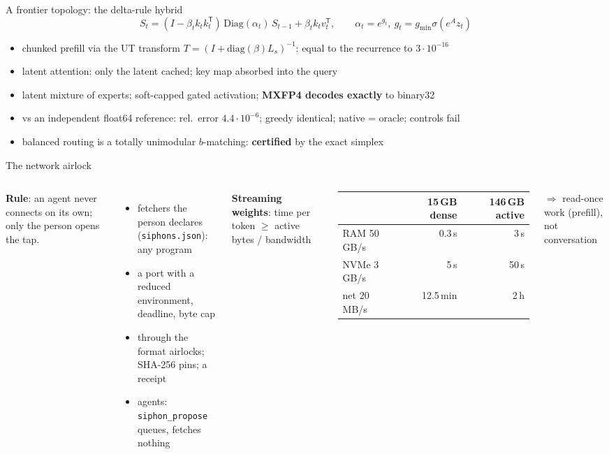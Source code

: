 \documentclass[aspectratio=169,11pt]{beamer}
\begin{document}
\begin{frame}{A frontier topology: the delta-rule hybrid}
\small
\[
S_t = (I - \beta_t k_t k_t^{\mathsf T})\,\mathrm{Diag}(\alpha_t)\,S_{t-1} + \beta_t k_t v_t^{\mathsf T},
\qquad \alpha_t = e^{g_t},\ g_t = g_{\min}\sigma(e^{A}z_t)
\]
\vspace{-0.4em}
\begin{itemize}
\item chunked prefill via the UT transform $T = (I + \mathrm{diag}(\beta)L_s)^{-1}$: equal to the recurrence to $3\cdot10^{-16}$
\item latent attention: only the latent cached; key map absorbed into the query
\item latent mixture of experts; soft-capped gated activation; \textbf{MXFP4 decodes exactly} to binary32
\item vs an independent float64 reference: rel.\ error $4.4\cdot10^{-6}$; greedy identical; native = oracle; controls fail
\item balanced routing is a totally unimodular $b$-matching: \textbf{certified} by the exact simplex
\end{itemize}
\end{frame}

\begin{frame}{The network airlock}
\begin{columns}[T]
\textbf{Rule}: an agent never connects on its own; only the person opens the tap.
\begin{itemize}\small
\item fetchers the person declares (\texttt{siphons.json}): any program
\item a port with a reduced environment, deadline, byte cap
\item through the format airlocks; SHA-256 pins; a receipt
\item agents: \texttt{siphon\_propose} queues, fetches nothing
\end{itemize}
\textbf{Streaming weights}: time per token $\ge$ active bytes / bandwidth
\vspace{0.3em}

\scriptsize
\begin{tabular}{@{}lrr@{}}
\toprule
 & 15\,GB dense & 146\,GB active \\
\midrule
RAM 50\,GB/s & 0.3\,s & 3\,s \\
NVMe 3\,GB/s & 5\,s & 50\,s \\
net 20\,MB/s & 12.5\,min & 2\,h \\
\bottomrule
\end{tabular}

\small
$\Rightarrow$ read-once work (prefill), not conversation
\end{columns}
\end{frame}
\end{document}
